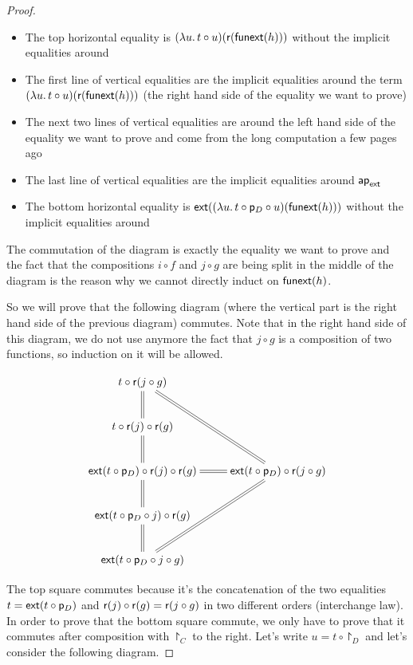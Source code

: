 \begin{proof}
  \begin{itemize}
  \item The top horizontal equality is
    ${(\lambda{}u.\,t\circ{}u)}\!\left({{\mathsf{r}}\!\left({\mathsf{funext}(h)}\right)}\right)$ without the
    implicit equalities around
  \item The first line of vertical equalities are the implicit equalities around
    the term ${(\lambda{}u.\,t\circ{}u)}\!\left({{\mathsf{r}}\!\left({\mathsf{funext}(h)}\right)}\right)$ (the
    right hand side of the equality we want to prove)
  \item The next two lines of vertical equalities are around the left hand side
    of the equality we want to prove and come from the long computation a few
    pages ago
  \item The last line of vertical equalities are the implicit equalities around
    $\mathsf{ap}_{\mathsf{ext}}$
  \item The bottom horizontal equality is
    ${\mathsf{ext}}\!\left({{(\lambda{}u.\,t\circ\mathsf{p}_D\circ{}u)}\!\left({\mathsf{funext}(h)}\right)}\right)$
    without the implicit equalities around
  \end{itemize}

  The commutation of the diagram is exactly the equality we want to prove and
  the fact that the compositions $i\circ f$ and $j\circ g$ are being split in
  the middle of the diagram is the reason why we cannot directly induct on
  $\mathsf{funext}(h)$.

  So we will prove that the following diagram (where the vertical part is the
  right hand side of the previous diagram) commutes. Note that in the right hand
  side of this diagram, we do not use anymore the fact that $j\circ g$ is a
  composition of two functions, so induction on it will be allowed.

  \[\xymatrix{
    t\circ\reflect(j\circ g) \ar@{=}[d] & \\
    t\circ\reflect(j)\circ\reflect(g) \ar@{=}[d] & \\
    \extend{t\circ\project_D}\circ\reflect(j)\circ\reflect(g) \ar@{=}[d] &
    \extend{t\circ\project_D}\circ\reflect(j\circ g) \ar@{=}[l] \ar@{=}[luu]
    \ar@{=}[ldd] \\
    \extend{t\circ\project_D\circ j}\circ\reflect(g) \ar@{=}[d] & \\
    \extend{t\circ\project_D\circ j\circ g} & \\
  }\]

  The top square commutes because it’s the concatenation of the two equalities
  $t=\mathsf{ext}(t\circ\mathsf{p}_D)$ and $\mathsf{r}(j)\circ\mathsf{r}(g)=\mathsf{r}(j\circ
  g)$ in two different orders (interchange law). In order to prove that the
  bottom square commute, we only have to prove that it commutes after
  composition with $\project_C$ to the right. Let’s write $u=t\circ\project_D$
  and let’s consider the following diagram.


\end{proof}
